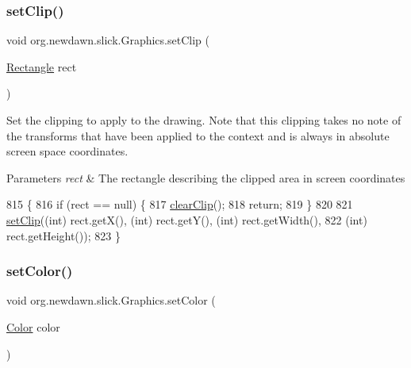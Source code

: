 \subsubsection{\texorpdfstring{set\+Clip()}{setClip()}\hspace{0.1cm}{\footnotesize\ttfamily [2/2]}}
{\footnotesize\ttfamily void org.\+newdawn.\+slick.\+Graphics.\+set\+Clip (\begin{DoxyParamCaption}\item[{\mbox{\hyperlink{classorg_1_1newdawn_1_1slick_1_1geom_1_1_rectangle}{Rectangle}}}]{rect }\end{DoxyParamCaption})\hspace{0.3cm}{\ttfamily [inline]}}

Set the clipping to apply to the drawing. Note that this clipping takes no note of the transforms that have been applied to the context and is always in absolute screen space coordinates.


\begin{DoxyParams}{Parameters}
{\em rect} & The rectangle describing the clipped area in screen coordinates \\
\hline
\end{DoxyParams}

\begin{DoxyCode}
815                                         \{
816         \textcolor{keywordflow}{if} (rect == null) \{
817             \mbox{\hyperlink{classorg_1_1newdawn_1_1slick_1_1_graphics_a9e08c31449d2021836928b18daee5083}{clearClip}}();
818             \textcolor{keywordflow}{return};
819         \}
820 
821         \mbox{\hyperlink{classorg_1_1newdawn_1_1slick_1_1_graphics_abeab2710876092eecc384bc6221203e5}{setClip}}((\textcolor{keywordtype}{int}) rect.getX(), (int) rect.getY(), (int) rect.getWidth(),
822                 (int) rect.getHeight());
823     \}
\end{DoxyCode}
\mbox{\label{classorg_1_1newdawn_1_1slick_1_1_graphics_a725360b8b6c1b50306fe2e8ff4ed44fd}} 
\subsubsection{\texorpdfstring{set\+Color()}{setColor()}}
{\footnotesize\ttfamily void org.\+newdawn.\+slick.\+Graphics.\+set\+Color (\begin{DoxyParamCaption}\item[{\mbox{\hyperlink{classorg_1_1newdawn_1_1slick_1_1_color}{Color}}}]{color }\end{DoxyParamCaption})\hspace{0.3cm}{\ttfamily [inline]}}

